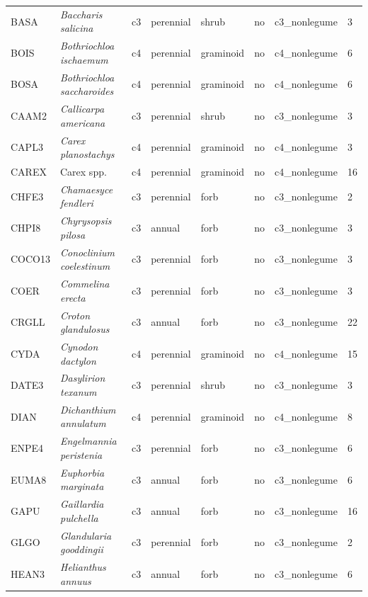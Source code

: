 \begin{landscape}
\begin{table}[]
{\begin{tabular}{p{2cm}p{5cm}p{2cm}p{2cm}p{2cm}p{2cm}p{3.5cm}p{2cm}}
            BASA   & \textit{Baccharis salicina}        & c3 & perennial & shrub          & no  & c3\_nonlegume & 3  \\
            BOIS   & \textit{Bothriochloa ischaemum}    & c4 & perennial & graminoid      & no  & c4\_nonlegume & 6  \\
            BOSA   & \textit{Bothriochloa saccharoides} & c4 & perennial & graminoid      & no  & c4\_nonlegume & 6  \\
            CAAM2  & \textit{Callicarpa americana}      & c3 & perennial & shrub          & no  & c3\_nonlegume & 3  \\
            CAPL3  & \textit{Carex planostachys}        & c4 & perennial & graminoid      & no  & c4\_nonlegume & 3  \\
            CAREX  & Carex spp.                         & c4 & perennial & graminoid      & no  & c4\_nonlegume & 16 \\
            CHFE3  & \textit{Chamaesyce fendleri}       & c3 & perennial & forb           & no  & c3\_nonlegume & 2  \\
            CHPI8  & \textit{Chyrysopsis pilosa}        & c3 & annual    & forb           & no  & c3\_nonlegume & 3  \\
            COCO13 & \textit{Conoclinium coelestinum}   & c3 & perennial & forb           & no  & c3\_nonlegume & 3  \\
            COER   & \textit{Commelina erecta}          & c3 & perennial & forb           & no  & c3\_nonlegume & 3  \\
            CRGLL  & \textit{Croton glandulosus}        & c3 & annual    & forb           & no  & c3\_nonlegume & 22 \\
            CYDA   & \textit{Cynodon dactylon}          & c4 & perennial & graminoid      & no  & c4\_nonlegume & 15 \\
            DATE3  & \textit{Dasylirion texanum}        & c3 & perennial & shrub          & no  & c3\_nonlegume & 3  \\
            DIAN   & \textit{Dichanthium annulatum}     & c4 & perennial & graminoid      & no  & c4\_nonlegume & 8  \\
            ENPE4  & \textit{Engelmannia peristenia}    & c3 & perennial & forb           & no  & c3\_nonlegume & 6  \\
            EUMA8  & \textit{Euphorbia marginata}       & c3 & annual    & forb           & no  & c3\_nonlegume & 6  \\
            GAPU   & \textit{Gaillardia pulchella}      & c3 & annual    & forb           & no  & c3\_nonlegume & 16 \\
            GLGO   & \textit{Glandularia gooddingii}    & c3 & perennial & forb           & no  & c3\_nonlegume & 2  \\
            HEAN3  & \textit{Helianthus annuus}         & c3 & annual    & forb           & no  & c3\_nonlegume & 6  \\
            \hline
        \end{tabular}}
    \end{table}
\end{landscape}
\clearpage

